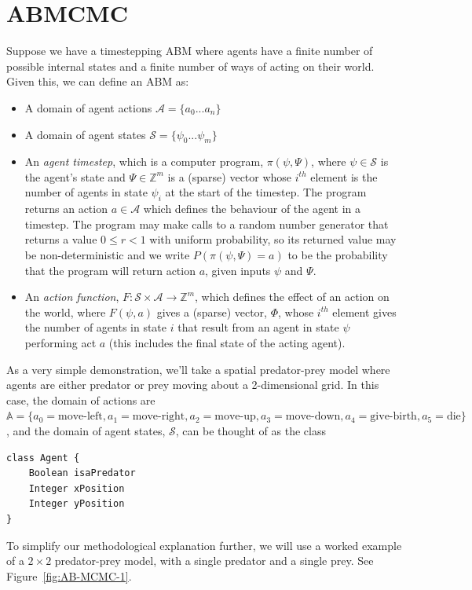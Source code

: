 \section{ABMCMC}


Suppose we have a timestepping ABM where agents have a finite number of possible internal states and a finite number of ways of acting on their world. Given this, we can define an ABM as:
\begin{itemize}
\item A domain of agent actions $\mathcal{A} =\{ a_0 ... a_n \}$

\item A domain of agent states $\mathcal{S} = \{\psi_0 ... \psi_m\}$

\item An \textit{agent timestep}, which is a computer program, $\pi(\psi,\Psi)$, where $\psi \in \mathcal{S}$ is the agent's state and $\Psi \in \mathbb{Z}^m$ is a (sparse) vector whose $i^{th}$ element is the number of agents in state $\psi_i$ at the start of the timestep. The program returns an action $a \in \mathcal{A}$ which defines the behaviour of the agent in a timestep. The program may make calls to a random number generator that returns a value $0 \le r < 1$ with uniform probability, so its returned value may be non-deterministic and we write $P(\pi(\psi,\Psi)=a)$ to be the probability that the program will return action $a$, given inputs $\psi$ and $\Psi$. 

\item An \textit{action function}, $F: \mathcal{S} \times \mathcal{A} \to \mathbb{Z}^m$, which defines the effect of an action on the world, where $F(\psi, a)$ gives a (sparse) vector, $\Phi$, whose $i^{th}$ element gives the number of agents in state $i$ that result from an agent in state $\psi$ performing act $a$ (this includes the final state of the acting agent).
\end{itemize}

As a very simple demonstration, we'll take a spatial predator-prey model where agents are either predator or prey moving about a 2-dimensional grid. In this case, the domain of actions are $\mathbb{A} = \{ a_0=\textrm{move-left}, a_1=\textrm{move-right}, a_2=\textrm{move-up}, a_3=\textrm{move-down}, a_4=\textrm{give-birth}, a_5=\textrm{die}\}$, and the domain of agent states, $\mathcal{S}$, can be thought of as the class 
\begin{lstlisting}
class Agent {
	Boolean	isaPredator
	Integer	xPosition
	Integer	yPosition
}
\end{lstlisting}
To simplify our methodological explanation further, we will use a worked example of a $2\times2$ predator-prey model, with a single predator and a single prey. See Figure~\ref{fig:AB-MCMC-1}.

